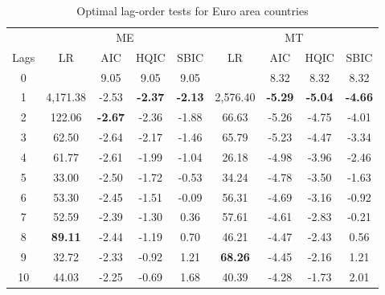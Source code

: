 \documentclass[a4paper, twoside]{templates/ociamthesis}
\begin{document}
\begin{table}[H]

\caption{\label{tab:TableC24}Optimal lag-order tests for Euro area countries}
\centering
\fontsize{10}{12}\selectfont
\begin{tabular}[t]{ccccccccc}
\toprule
\multicolumn{1}{c}{ } & \multicolumn{4}{c}{ME} & \multicolumn{4}{c}{MT} \\
\cmidrule(l{3pt}r{3pt}){2-5} \cmidrule(l{3pt}r{3pt}){6-9}
Lags & LR & AIC & HQIC & SBIC & LR & AIC & HQIC & SBIC\\
\midrule
0 &  & 9.05 & 9.05 & 9.05 &  & 8.32 & 8.32 & 8.32\\
1 & 4,171.38 & -2.53 & \textbf{-2.37} & \textbf{-2.13} & 2,576.40 & \textbf{-5.29} & \textbf{-5.04} & \textbf{-4.66}\\
2 & 122.06 & \textbf{-2.67} & -2.36 & -1.88 & 66.63 & -5.26 & -4.75 & -4.01\\
3 & 62.50 & -2.64 & -2.17 & -1.46 & 65.79 & -5.23 & -4.47 & -3.34\\
4 & 61.77 & -2.61 & -1.99 & -1.04 & 26.18 & -4.98 & -3.96 & -2.46\\
5 & 33.00 & -2.50 & -1.72 & -0.53 & 34.24 & -4.78 & -3.50 & -1.63\\
6 & 53.30 & -2.45 & -1.51 & -0.09 & 56.31 & -4.69 & -3.16 & -0.92\\
7 & 52.59 & -2.39 & -1.30 & 0.36 & 57.61 & -4.61 & -2.83 & -0.21\\
8 & \textbf{89.11} & -2.44 & -1.19 & 0.70 & 46.21 & -4.47 & -2.43 & 0.56\\
9 & 32.72 & -2.33 & -0.92 & 1.21 & \textbf{68.26} & -4.45 & -2.16 & 1.21\\
10 & 44.03 & -2.25 & -0.69 & 1.68 & 40.39 & -4.28 & -1.73 & 2.01\\
\bottomrule
\end{tabular}
\end{table}
\end{document}
